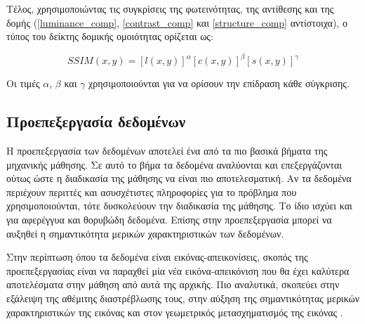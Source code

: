 \documentclass[a4paper,12pt]{article}
\begin{document}
Τέλος, χρησιμοποιώντας τις συγκρίσεις της φωτεινότητας, της αντίθεσης και της
δομής (\eqref{luminance_comp}, \eqref{contrast_comp} και \eqref{structure_comp}
αντίστοιχα), ο τύπος του δείκτης δομικής ομοιότητας ορίζεται ως:

\begin{equation} \label{eq:SSIM:1}
    SSIM(x,y) = \left[l(x,y)\right]^\alpha \left[c(x,y)\right]^\beta 
                \left[s(x,y)\right]^\gamma
\end{equation}

Οι τιμές $\alpha$, $\beta$ και $\gamma$ χρησιμοποιούνται για να ορίσουν την
επίδραση κάθε σύγκρισης.

\subsection{Προεπεξεργασία δεδομένων} \label{preprocessing:1}

Η προεπεξεργασία των δεδομένων αποτελεί ένα από τα πιο βασικά βήματα της
μηχανικής μάθησης. Σε αυτό το βήμα τα δεδομένα αναλύονται και επεξεργάζονται
ούτως ώστε η διαδικασία της μάθησης να είναι πιο αποτελεσματική. Αν τα δεδομένα
περιέχουν περιττές και ασυσχέτιστες πληροφορίες για το πρόβλημα που
χρησιμοποιούνται, τότε δυσκολεύουν την διαδικασία της μάθησης. Το ίδιο ισχύει
και για αφερέγγυα και θορυβώδη δεδομένα. Επίσης στην προεπεξεργασία μπορεί να
αυξηθεί η σημαντικότητα μερικών χαρακτηριστικών των δεδομένων.

Στην περίπτωση όπου τα δεδομένα είναι εικόνας-απεικονίσεις, σκοπός της
προεπεξεργασίας είναι να παραχθεί μία νέα εικόνα-απεικόνιση που θα έχει καλύτερα
αποτελέσματα στην μάθηση από αυτά της αρχικής. Πιο αναλυτικά, σκοπεύει στην
εξάλειψη της αθέμιτης διαστρέβλωσης τους, στην αύξηση της σημαντικότητας μερικών
χαρακτηριστικών της εικόνας και στον γεωμετρικός μετασχηματισμός της εικόνας
\cite{Image_preprocessing:1}.

\end{document}
